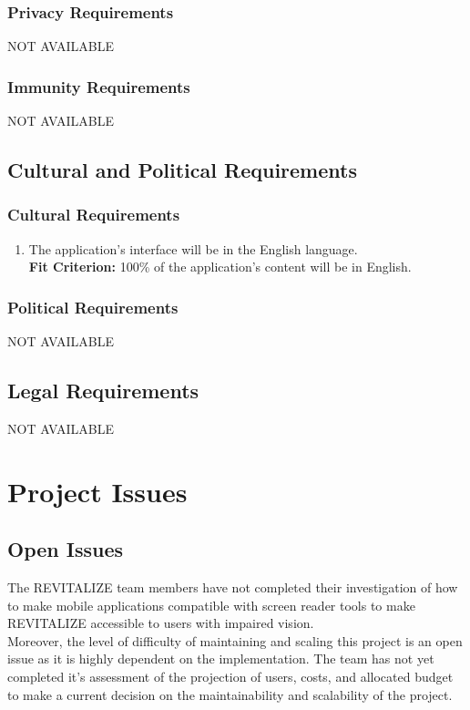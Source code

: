 \documentclass[12pt,letterpaper]{article}
\begin{document}
\subsubsection{Privacy Requirements}
NOT AVAILABLE
\subsubsection{Immunity Requirements}
NOT AVAILABLE
\subsection{Cultural and Political Requirements}
\subsubsection{Cultural Requirements}
\begin{enumerate}[{CU}1] 
    \item The application's interface will be in the English language. \\
    {\textbf{Fit Criterion:} 100\% of the application's content will be in English. }
\end{enumerate}
\subsubsection{Political Requirements}
NOT AVAILABLE
\subsection{Legal Requirements}
NOT AVAILABLE

\section{Project Issues}

\subsection{Open Issues}
The REVITALIZE team members have not completed their investigation of how to make mobile applications compatible with screen reader tools to make REVITALIZE accessible to users with impaired vision.\\

Moreover, the level of difficulty of maintaining and scaling this project is an open issue as it is highly dependent on the implementation. The team has not yet completed it's assessment of the projection of users, costs, and allocated budget to make a current decision on the maintainability and scalability of the project.\\
\end{document}
